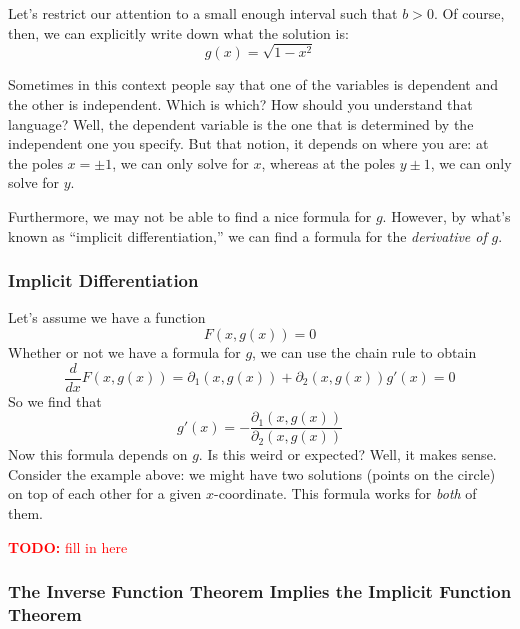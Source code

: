 \documentclass{article}
\newcommand{\TODO}[1]{\textcolor{red}{\textbf{TODO:} #1}}
\begin{document}
Let's restrict our attention to a small enough interval such that \(b > 0\). Of course, then, we can explicitly write down what the solution is:
\[g(x) = \sqrt{1 - x^2}\]

Sometimes in this context people say that one of the variables is dependent and the other is independent. Which is which? How should you understand that language? Well, the dependent variable is the one that is determined by the independent one you specify. But that notion, it depends on where you are: at the poles \(x = \pm 1\), we can only solve for \(x\), whereas at the poles \(y \pm 1\), we can only solve for \(y\).

Furthermore, we may not be able to find a nice formula for \(g\). However, by what's known as ``implicit differentiation,'' we can find a formula for the \textit{derivative of} \(g\).

\subsubsection{Implicit Differentiation}
Let's assume we have a function
\[F(x, g(x)) = 0\]
Whether or not we have a formula for \(g\), we can use the chain rule to obtain
\[\frac{d}{dx}F(x, g(x)) = \partial_1(x, g(x)) + \partial_2(x, g(x))g'(x) = 0\]
So we find that
\[g'(x) = -\frac{\partial_1(x, g(x))}{\partial_2(x, g(x))}\]
Now this formula depends on \(g\). Is this weird or expected? Well, it makes sense. Consider the example above: we might have two solutions (points on the circle) on top of each other for a given \(x\)-coordinate. This formula works for \textit{both} of them.


\TODO{fill in here}


\subsubsection{The Inverse Function Theorem Implies the Implicit Function Theorem}
\end{document}
